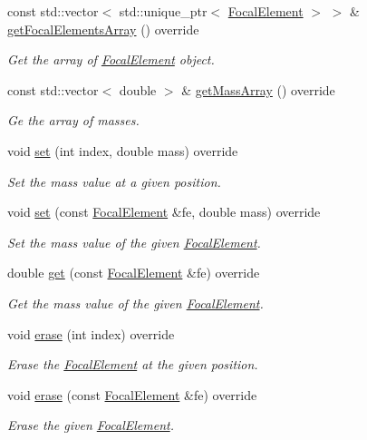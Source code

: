 \begin{DoxyCompactItemize}
const std\+::vector$<$ std\+::unique\+\_\+ptr$<$ \hyperlink{classFocalElement}{Focal\+Element} $>$ $>$ \& \hyperlink{classHashableFocalElementContainer_a11ab286119f448d1a480dd4336875b9f}{get\+Focal\+Elements\+Array} () override
\begin{DoxyCompactList}\small\item\em Get the array of \hyperlink{classFocalElement}{Focal\+Element} object. \end{DoxyCompactList}\item 
const std\+::vector$<$ double $>$ \& \hyperlink{classHashableFocalElementContainer_a8be85b980960704d31563d0ad64b8aad}{get\+Mass\+Array} () override
\begin{DoxyCompactList}\small\item\em Ge the array of masses. \end{DoxyCompactList}\item 
void \hyperlink{classHashableFocalElementContainer_a95613540899807e8094f39f75f92e088}{set} (int index, double mass) override
\begin{DoxyCompactList}\small\item\em Set the mass value at a given position. \end{DoxyCompactList}\item 
void \hyperlink{classHashableFocalElementContainer_a16ac0c831312f31641aa716b19a3efed}{set} (const \hyperlink{classFocalElement}{Focal\+Element} \&fe, double mass) override
\begin{DoxyCompactList}\small\item\em Set the mass value of the given \hyperlink{classFocalElement}{Focal\+Element}. \end{DoxyCompactList}\item 
double \hyperlink{classHashableFocalElementContainer_a0b384b37bee91526a932756a65727be0}{get} (const \hyperlink{classFocalElement}{Focal\+Element} \&fe) override
\begin{DoxyCompactList}\small\item\em Get the mass value of the given \hyperlink{classFocalElement}{Focal\+Element}. \end{DoxyCompactList}\item 
void \hyperlink{classHashableFocalElementContainer_a06450d7d5174bdeecd2238570143e2b3}{erase} (int index) override
\begin{DoxyCompactList}\small\item\em Erase the \hyperlink{classFocalElement}{Focal\+Element} at the given position. \end{DoxyCompactList}\item 
void \hyperlink{classHashableFocalElementContainer_a8d072157c5715b764e3158427157a242}{erase} (const \hyperlink{classFocalElement}{Focal\+Element} \&fe) override
\begin{DoxyCompactList}\small\item\em Erase the given \hyperlink{classFocalElement}{Focal\+Element}. \end{DoxyCompactList}\end{DoxyCompactItemize}


